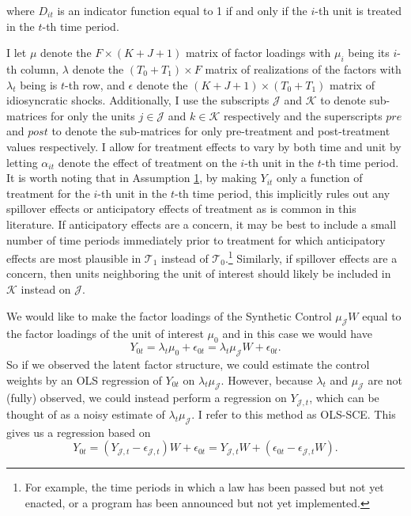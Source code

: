 \documentclass{article}
\begin{document}
where $D_{it}$ is an indicator function equal to 1 if and only if the $i$-th unit is treated in the $t$-th time period. 
\par
I let $\mu$ denote the $F \times (K+J+1)$ matrix of factor loadings with $\mu_i$ being its $i$-th column, $\lambda$ denote the $(T_0+T_1) \times F$ matrix of realizations of the factors with $\lambda_t$ being is $t$-th row, and $\epsilon$ denote the $(K+J+1) \times (T_0 + T_1)$ matrix of idiosyncratic shocks. Additionally, I use the subscripts $\mathcal{J}$ and $\mathcal{K}$ to denote sub-matrices for only the units $j \in \mathcal{J}$ and $k \in \mathcal{K}$ respectively and the superscripts $pre$ and $post$ to denote the sub-matrices for only pre-treatment and post-treatment values respectively. I allow for treatment effects to vary by both time and unit by letting $\alpha_{it}$ denote the effect of treatment on the $i$-th unit in the $t$-th time period. It is worth noting that in Assumption \hyperref[A1]{1}, by making $Y_{it}$ only a function of treatment for the $i$-th unit in the $t$-th time period, this implicitly rules out any spillover effects or anticipatory effects of treatment as is common in this literature. If anticipatory effects are a concern, it may be best to include a small number of time periods immediately prior to treatment for which anticipatory effects are most plausible in $\mathcal{T}_1$ instead of $\mathcal{T}_0$.\footnote{For example, the time periods in which a law has been passed but not yet enacted, or a program has been announced but not yet implemented.} Similarly, if spillover effects are a concern, then units neighboring the unit of interest should likely be included in $\mathcal{K}$ instead on $\mathcal{J}$.
\par
We would like to make the factor loadings of the Synthetic Control $\mu_{\mathcal{J}} W$ equal to the factor loadings of the unit of interest $\mu_0$ and in this case we would have $$Y_{0t} = \lambda_t \mu_0 + \epsilon_{0t} = \lambda_t \mu_{\mathcal{J}}W + \epsilon_{0t}.$$
So if we observed the latent factor structure, we could estimate the control weights by an OLS regression of $Y_{0t}$ on $\lambda_t \mu_{\mathcal{J}}$. However, because $\lambda_t$ and $\mu_{\mathcal{J}}$ are not (fully) observed, we could instead perform a regression on $Y_{\mathcal{J},t}$, which can be thought of as a noisy estimate of $\lambda_t \mu_{\mathcal{J}}$. I refer to this method as OLS-SCE. This gives us a regression based on
\begin{equation*}
    Y_{0t} = (Y_{\mathcal{J},t} - \epsilon_{\mathcal{J},t})W + \epsilon_{0t} = Y_{\mathcal{J},t}W + (\epsilon_{0t} - \epsilon_{\mathcal{J},t}W).
\end{equation*}
\end{document}
